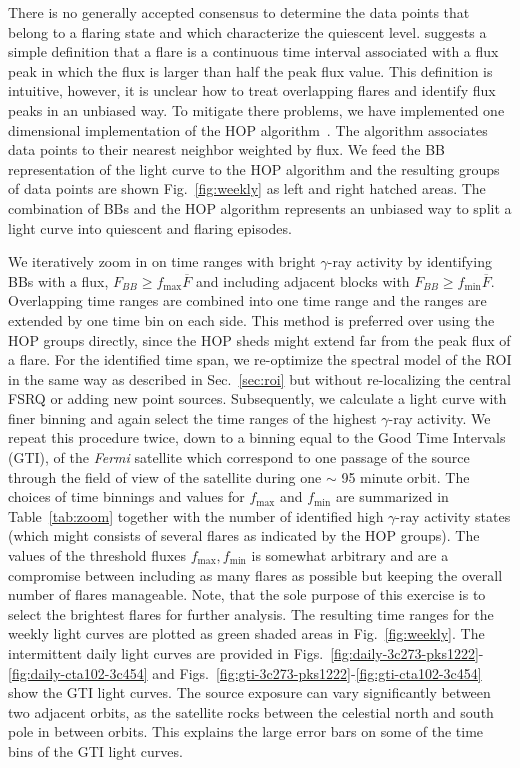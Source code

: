 \documentclass[twocolumn]{aastex62}
\newcommand{\gray}{$\gamma$-ray\xspace}
\newcommand{\Fermi}{\emph{Fermi}\xspace}
\begin{document}
There is no generally accepted consensus to determine the data points that belong to a flaring state and which characterize the quiescent level. \citet{2013MNRAS.430.1324N} suggests a simple definition that a flare is a continuous time interval associated with a flux peak in which the flux is larger than half the peak flux value. 
This definition is intuitive, however, it is unclear how to treat overlapping flares and identify flux peaks in an unbiased way. To mitigate there problems, we have implemented one dimensional implementation of the HOP algorithm~\citep{Eisenstein:1997sm}.
The algorithm associates data points to their nearest neighbor weighted by flux.
We feed the BB representation of the light curve to the HOP algorithm and the resulting groups of data points are shown 
Fig.~\ref{fig:weekly} as left and right hatched areas. 
The combination of BBs and the HOP algorithm represents an unbiased way to split a light curve into quiescent and flaring episodes.

We iteratively zoom in on time ranges with bright \gray activity by identifying BBs with a flux, $F_{BB} \geqslant f_\mathrm{max}\overline{F}$ and including adjacent blocks with $F_{BB} \geqslant f_\mathrm{min}\overline{F}$. 
Overlapping time ranges are combined into one time range and the ranges are extended by one time bin on each side.
This method is preferred over using the HOP groups directly, since the HOP sheds might extend far from the peak flux of a flare. 
For the identified time span, we re-optimize the spectral model of the ROI in the same way as described in Sec.~\ref{sec:roi} but without re-localizing the central FSRQ or adding new point sources. Subsequently, we calculate a light curve with finer binning and again select the time ranges of the highest \gray activity. We repeat this procedure twice, down to a binning equal to the Good Time Intervals (GTI), of the \Fermi satellite which correspond to one passage of the source through the field of view of the satellite during one $\sim$ 95 minute orbit.
The choices of time binnings and values for $f_\mathrm{max}$ and $f_\mathrm{min}$ are summarized in Table~\ref{tab:zoom} together with the number of identified high \gray activity states (which might consists of several flares as indicated by the HOP groups).
The values of the threshold fluxes $f_\mathrm{max}, f_\mathrm{min}$ is somewhat arbitrary and are a compromise between including as many flares as possible but keeping the overall number of flares manageable. Note, that the sole purpose of this exercise is to select the brightest flares for  further analysis. 
The resulting time ranges for the weekly light curves are plotted as green shaded areas in Fig.~\ref{fig:weekly}.
The intermittent daily light curves are provided in Figs.~\ref{fig:daily-3c273-pks1222}-\ref{fig:daily-cta102-3c454} and  Figs.~\ref{fig:gti-3c273-pks1222}-\ref{fig:gti-cta102-3c454} show the GTI light curves. 
The source exposure can vary significantly between two adjacent orbits, as the satellite rocks between the celestial north and south pole in between orbits. This explains the large error bars on some of the time bins of the GTI light curves.
\end{document}
